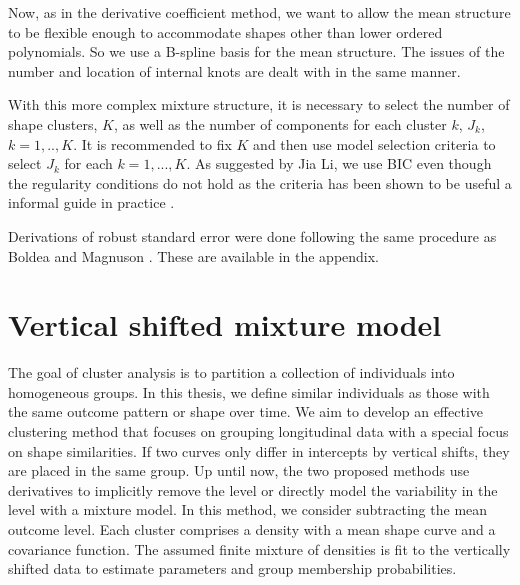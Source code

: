 Now, as in the derivative coefficient method, we want to allow the mean structure to be flexible enough to accommodate shapes other than lower ordered polynomials. So we use a B-spline basis for the mean structure. The issues of the number and location of internal knots are dealt with in the same manner.

With this more complex mixture structure, it is necessary to select the number of shape clusters, $K$, as well as the number of components for each cluster $k$, $J_{k}$, $k=1,..,K$. It is recommended to fix $K$ and then use model selection criteria to select $J_{k}$ for each $k=1,...,K$. As suggested by Jia Li, we use BIC even though the regularity conditions do not hold as the criteria has been shown to be useful a informal guide in practice \cite{li2005}.

Derivations of robust standard error  were done following the same procedure as Boldea and Magnuson \cite{boldea2009}. These are available in the appendix.

\section{Vertical shifted mixture model}
The goal of cluster analysis is to partition a collection of individuals into homogeneous groups. In this thesis, we define similar individuals as those with the same outcome pattern or shape over time. We aim to develop an effective clustering method that focuses on grouping longitudinal data with a special focus on shape similarities. If two curves only differ in intercepts by vertical shifts, they are placed in the same group. Up until now, the two proposed methods use derivatives to implicitly remove the level or directly model the variability in the level with a mixture model.  In this method, we consider subtracting the mean outcome level. Each cluster comprises a density with a mean shape curve and a covariance function. The assumed finite mixture of densities is fit to the vertically shifted data to estimate parameters and group membership probabilities. 

